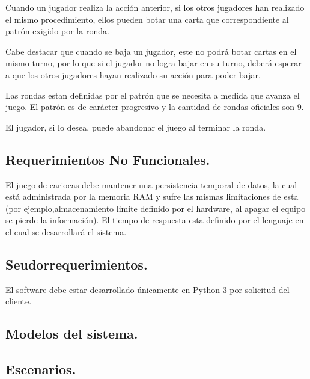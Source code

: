 \documentclass[60pt]{article}
\begin{document}
Cuando un jugador realiza la acción anterior, si los otros jugadores han realizado el mismo procedimiento, ellos pueden botar una carta que correspondiente al \gls{patrón} exigido por la ronda.

Cabe destacar que cuando se baja un jugador, este no podrá botar cartas en el mismo turno, por lo que si el jugador no logra bajar en su turno, deberá esperar a que los otros jugadores hayan realizado su acción para poder bajar.

Las rondas estan definidas por el patrón que se necesita a medida que avanza el juego. El \gls{patrón} es de carácter progresivo y la cantidad de rondas oficiales son 9.

El jugador, si lo desea, puede abandonar el juego al terminar la ronda.
\subsection{Requerimientos No Funcionales.}\label{cap:requerimientos-no-funcionales}
El juego de cariocas debe mantener una persistencia temporal de datos, la cual está administrada por la memoria RAM y sufre las mismas limitaciones de esta (por ejemplo,almacenamiento limite definido por el hardware, al apagar el equipo se pierde la información).  El tiempo de respuesta esta definido por el lenguaje en el cual se desarrollará el sistema.

\subsection{Seudorrequerimientos.}\label{cap:seudorrequerimientos}
El software debe estar desarrollado únicamente en Python 3 por solicitud del cliente.
\subsection{Modelos del sistema.}\label{cap:modelos-sistema}

\subsection{Escenarios.}\label{cap:escenarios}
\end{document}
